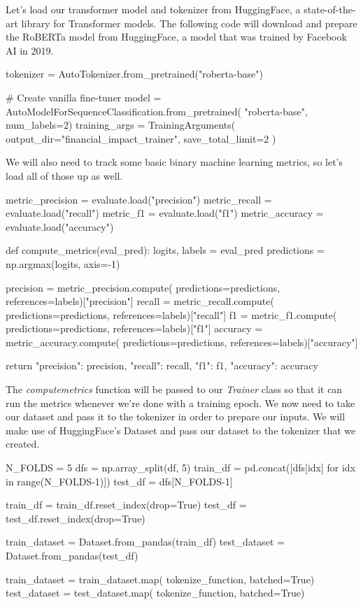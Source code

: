 Let's load our transformer model and tokenizer from HuggingFace\cite{wolf2020huggingfaces}, a state-of-the-art library for Transformer models.
The following code will download and prepare the RoBERTa\cite{liu2019roberta} model from HuggingFace, a model that was trained by Facebook AI in 2019.

\begin{python}
tokenizer = AutoTokenizer.from_pretrained("roberta-base")

# Create vanilla fine-tuner
model = AutoModelForSequenceClassification.from_pretrained(
    "roberta-base", num_labels=2)
training_args = TrainingArguments(
    output_dir="financial_impact_trainer",
    save_total_limit=2
)
\end{python}

We will also need to track some basic binary machine learning metrics, so let's load all of those up as well.

\begin{python}
metric_precision = evaluate.load("precision")
metric_recall = evaluate.load("recall")
metric_f1 = evaluate.load("f1")
metric_accuracy = evaluate.load("accuracy")

def compute_metrics(eval_pred):
    logits, labels = eval_pred
    predictions = np.argmax(logits, axis=-1)

    precision = metric_precision.compute(
        predictions=predictions,
        references=labels)["precision"]
    recall = metric_recall.compute(
        predictions=predictions,
        references=labels)["recall"]
    f1 = metric_f1.compute(
        predictions=predictions,
        references=labels)["f1"]
    accuracy = metric_accuracy.compute(
        predictions=predictions,
        references=labels)["accuracy"]

    return {
        "precision": precision,
        "recall": recall,
        "f1": f1,
        "accuracy": accuracy
    }
\end{python}

The \textit{compute\textunderscore metrics} function will be passed to our \textit{Trainer} class so that it can run the metrics whenever we're done with a training epoch. We now need to take our dataset and pass it to the tokenizer in order to prepare our inputs. We will make use of HuggingFace's Dataset and pass our dataset to the tokenizer that we created.

\begin{python}
N_FOLDS = 5
dfs = np.array_split(df, 5)
train_df = pd.concat([dfs[idx] for idx in range(N_FOLDS-1)])
test_df = dfs[N_FOLDS-1]

train_df = train_df.reset_index(drop=True)
test_df = test_df.reset_index(drop=True)

train_dataset = Dataset.from_pandas(train_df)
test_dataset = Dataset.from_pandas(test_df)

train_dataset = train_dataset.map(
    tokenize_function, batched=True)
test_dataset = test_dataset.map(
    tokenize_function, batched=True)
\end{python}

